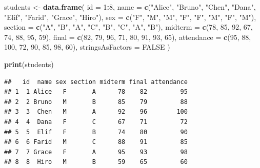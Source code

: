 \documentclass[
]{article}
\newenvironment{Shaded}{\begin{snugshade}}{\end{snugshade}}
\newcommand{\AttributeTok}[1]{\textcolor[rgb]{0.13,0.29,0.53}{#1}}
\newcommand{\ConstantTok}[1]{\textcolor[rgb]{0.56,0.35,0.01}{#1}}
\newcommand{\DecValTok}[1]{\textcolor[rgb]{0.00,0.00,0.81}{#1}}
\newcommand{\FunctionTok}[1]{\textcolor[rgb]{0.13,0.29,0.53}{\textbf{#1}}}
\newcommand{\NormalTok}[1]{#1}
\newcommand{\OtherTok}[1]{\textcolor[rgb]{0.56,0.35,0.01}{#1}}
\newcommand{\SpecialCharTok}[1]{\textcolor[rgb]{0.81,0.36,0.00}{\textbf{#1}}}
\newcommand{\StringTok}[1]{\textcolor[rgb]{0.31,0.60,0.02}{#1}}
\begin{document}
\begin{Shaded}
\begin{Highlighting}[]
\NormalTok{students }\OtherTok{\textless{}{-}} \FunctionTok{data.frame}\NormalTok{(}
  \AttributeTok{id =} \DecValTok{1}\SpecialCharTok{:}\DecValTok{8}\NormalTok{,}
  \AttributeTok{name =} \FunctionTok{c}\NormalTok{(}\StringTok{"Alice"}\NormalTok{, }\StringTok{"Bruno"}\NormalTok{, }\StringTok{"Chen"}\NormalTok{, }\StringTok{"Dana"}\NormalTok{, }\StringTok{"Elif"}\NormalTok{, }\StringTok{"Farid"}\NormalTok{, }\StringTok{"Grace"}\NormalTok{, }\StringTok{"Hiro"}\NormalTok{),}
  \AttributeTok{sex =} \FunctionTok{c}\NormalTok{(}\StringTok{"F"}\NormalTok{, }\StringTok{"M"}\NormalTok{, }\StringTok{"M"}\NormalTok{, }\StringTok{"F"}\NormalTok{, }\StringTok{"F"}\NormalTok{, }\StringTok{"M"}\NormalTok{, }\StringTok{"F"}\NormalTok{, }\StringTok{"M"}\NormalTok{),}
  \AttributeTok{section =} \FunctionTok{c}\NormalTok{(}\StringTok{"A"}\NormalTok{, }\StringTok{"B"}\NormalTok{, }\StringTok{"A"}\NormalTok{, }\StringTok{"C"}\NormalTok{, }\StringTok{"B"}\NormalTok{, }\StringTok{"C"}\NormalTok{, }\StringTok{"A"}\NormalTok{, }\StringTok{"B"}\NormalTok{),}
  \AttributeTok{midterm =} \FunctionTok{c}\NormalTok{(}\DecValTok{78}\NormalTok{, }\DecValTok{85}\NormalTok{, }\DecValTok{92}\NormalTok{, }\DecValTok{67}\NormalTok{, }\DecValTok{74}\NormalTok{, }\DecValTok{88}\NormalTok{, }\DecValTok{95}\NormalTok{, }\DecValTok{59}\NormalTok{),}
  \AttributeTok{final =} \FunctionTok{c}\NormalTok{(}\DecValTok{82}\NormalTok{, }\DecValTok{79}\NormalTok{, }\DecValTok{96}\NormalTok{, }\DecValTok{71}\NormalTok{, }\DecValTok{80}\NormalTok{, }\DecValTok{91}\NormalTok{, }\DecValTok{93}\NormalTok{, }\DecValTok{65}\NormalTok{),}
  \AttributeTok{attendance =} \FunctionTok{c}\NormalTok{(}\DecValTok{95}\NormalTok{, }\DecValTok{88}\NormalTok{, }\DecValTok{100}\NormalTok{, }\DecValTok{72}\NormalTok{, }\DecValTok{90}\NormalTok{, }\DecValTok{85}\NormalTok{, }\DecValTok{98}\NormalTok{, }\DecValTok{60}\NormalTok{),}
  \AttributeTok{stringsAsFactors =} \ConstantTok{FALSE}
\NormalTok{)}

\FunctionTok{print}\NormalTok{(students)}
\end{Highlighting}
\end{Shaded}

\begin{verbatim}
##   id  name sex section midterm final attendance
## 1  1 Alice   F       A      78    82         95
## 2  2 Bruno   M       B      85    79         88
## 3  3  Chen   M       A      92    96        100
## 4  4  Dana   F       C      67    71         72
## 5  5  Elif   F       B      74    80         90
## 6  6 Farid   M       C      88    91         85
## 7  7 Grace   F       A      95    93         98
## 8  8  Hiro   M       B      59    65         60
\end{verbatim}
\end{document}
